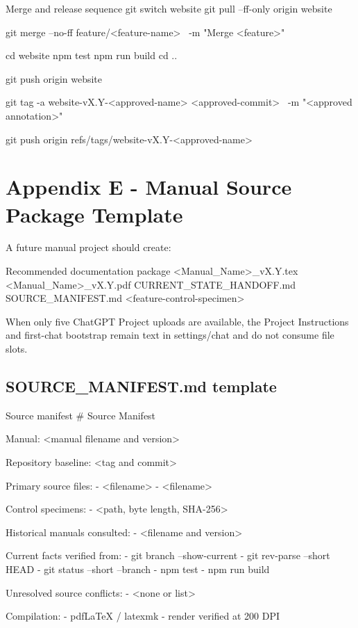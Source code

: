 \documentclass[11pt,letterpaper]{article}
\begin{document}
\begin{commandbox}{Merge and release sequence}
git switch website
git pull --ff-only origin website

git merge --no-ff feature/<feature-name> \
  -m "Merge <feature>"

cd website
npm test
npm run build
cd ..

git push origin website

git tag -a website-vX.Y-<approved-name> <approved-commit> \
  -m "<approved annotation>"

git push origin refs/tags/website-vX.Y-<approved-name>
\end{commandbox}

\section{Appendix E - Manual Source Package Template}

A future manual project should create:

\begin{codebox}{Recommended documentation package}
<Manual_Name>_vX.Y.tex
<Manual_Name>_vX.Y.pdf
CURRENT_STATE_HANDOFF.md
SOURCE_MANIFEST.md
<feature-control-specimen>
\end{codebox}

When only five ChatGPT Project uploads are available, the Project Instructions
and first-chat bootstrap remain text in settings/chat and do not consume file
slots.

\subsection*{SOURCE\_MANIFEST.md template}

\begin{codebox}{Source manifest}
# Source Manifest

Manual:
<manual filename and version>

Repository baseline:
<tag and commit>

Primary source files:
- <filename>
- <filename>

Control specimens:
- <path, byte length, SHA-256>

Historical manuals consulted:
- <filename and version>

Current facts verified from:
- git branch --show-current
- git rev-parse --short HEAD
- git status --short --branch
- npm test
- npm run build

Unresolved source conflicts:
- <none or list>

Compilation:
- pdfLaTeX / latexmk
- render verified at 200 DPI
\end{codebox}
\end{document}
